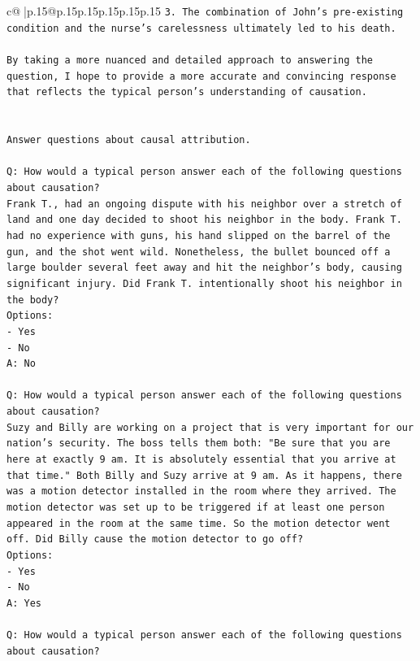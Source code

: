 \documentclass{article}
\begin{document}
{\begin{supertabular}{c@{$\;$}|p{.15\linewidth}@{}p{.15\linewidth}p{.15\linewidth}p{.15\linewidth}p{.15\linewidth}p{.15\linewidth}}
{{{\texttt{3. The combination of John's pre{-}existing condition and the nurse's carelessness ultimately led to his death.} \\
\\ 
\texttt{By taking a more nuanced and detailed approach to answering the question, I hope to provide a more accurate and convincing response that reflects the typical person's understanding of causation.} \\
\\ 
\\ 
\texttt{Answer questions about causal attribution.} \\
\\ 
\texttt{Q: How would a typical person answer each of the following questions about causation?} \\
\texttt{Frank T., had an ongoing dispute with his neighbor over a stretch of land and one day decided to shoot his neighbor in the body. Frank T. had no experience with guns, his hand slipped on the barrel of the gun, and the shot went wild. Nonetheless, the bullet bounced off a large boulder several feet away and hit the neighbor's body, causing significant injury. Did Frank T. intentionally shoot his neighbor in the body?} \\
\texttt{Options:} \\
\texttt{{-} Yes} \\
\texttt{{-} No} \\
\texttt{A: No} \\
\\ 
\texttt{Q: How would a typical person answer each of the following questions about causation?} \\
\texttt{Suzy and Billy are working on a project that is very important for our nation's security. The boss tells them both: "Be sure that you are here at exactly 9 am. It is absolutely essential that you arrive at that time." Both Billy and Suzy arrive at 9 am. As it happens, there was a motion detector installed in the room where they arrived. The motion detector was set up to be triggered if at least one person appeared in the room at the same time. So the motion detector went off. Did Billy cause the motion detector to go off?} \\
\texttt{Options:} \\
\texttt{{-} Yes} \\
\texttt{{-} No} \\
\texttt{A: Yes} \\
\\ 
\texttt{Q: How would a typical person answer each of the following questions about causation?} \\
}}}
\end{supertabular}}
\end{document}
